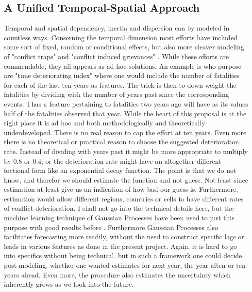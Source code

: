 \documentclass[a4paper]{article}
\begin{document}
\subsection{A Unified Temporal-Spatial Approach}

Temporal and spatial dependency, inertia and dispersion can by modeled in countless ways. Conserning the temporal dimension most efforts have included some sort of fixed, random or conditional effects, but also more cleaver modeling of "conflict traps" and "conflict induced grievances" \citep{Collier_Hoeffler_2004, Hegre_Sambanis_2006, Cederman_Gleditsch_Buhaug_2013, perry_2013}. While these efforts are commendable, they all appears as ad hoc solutions. An example is \cite{perry_2013} who purpose are "time deteriorating index" where one would include the number of fatalities for each of the last ten years as features. The trick is then to down-weight the fatalities by dividing with the number of years past since the corresponding events. Thus a feature pertaining to fatalities two years ago will have as its values half of the fatalities observed that year\cite[14]{perry_2013}. While the heart of this proposal is at the right place it is ad hoc and both methodologically and theoretically underdeveloped. There is no real reason to cap the effort at ten years. Even more there is no theoretical or practical reason to choose the suggested deterioration rate. Instead of dividing with years past it might be more appropriate to multiply by 0.8 or 0.4; or the deterioration rate might have an altogether different foctional form like an exponential decay function. The point is that we do not know, and therefor we should estimate the function and not guess. Not least since estimation at least give us an indication of how bad our guess is. Furthermore, estimation would allow different regions, countries or cells to have different rates of conflict deterioration. I shall not go into the technical details here, but the machine learning technique of Gaussian Processes have been used to just this purpose with good results before \citep{Gelman_2013, Mcelreath_2018}. Furthermore Gaussian Processes also facilitates forecasting more readily, without the need to construct specific lags or leads in various features as done in the present project. Again, it is hard to go into specifics without being technical, but in such a framework one could decide, post-modeling, whether one wanted estimates for next year, the year aften or ten years ahead. Even more, the procedure also estimates the uncertainty which inherently grows as we look into the future.\par
 
\end{document}
